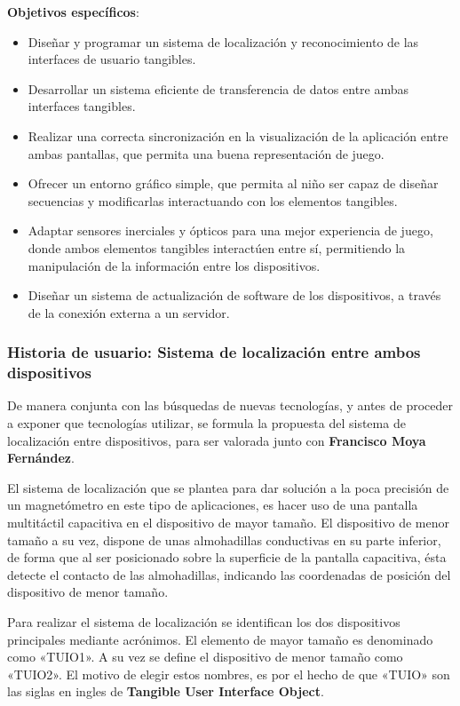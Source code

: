 \textbf{Objetivos específicos}:
\begin{itemize}
\item Diseñar y programar un sistema de localización y reconocimiento de las interfaces de usuario tangibles.

\item Desarrollar un sistema eficiente de transferencia de datos entre ambas interfaces tangibles.

\item Realizar una correcta sincronización en la visualización de la aplicación entre ambas pantallas, que permita una buena representación de juego.

\item Ofrecer un entorno gráfico simple, que permita al niño ser capaz de diseñar secuencias y modificarlas interactuando con los elementos tangibles.

\item Adaptar sensores inerciales y ópticos para una mejor experiencia de juego, donde ambos elementos tangibles interactúen entre sí, permitiendo la manipulación de la información entre los dispositivos.

\item Diseñar un sistema de actualización de software de los dispositivos, a través de la conexión externa a un servidor.
\end{itemize}

\subsubsection{Historia de usuario: Sistema de localización entre ambos dispositivos}
De manera conjunta con las búsquedas de nuevas tecnologías, y antes de proceder a exponer que tecnologías utilizar, se formula la propuesta del sistema de localización entre dispositivos, para ser valorada junto con \textbf{Francisco Moya Fernández}.

El sistema de localización que se plantea para dar solución a la poca precisión de un magnetómetro en este tipo de aplicaciones, es hacer uso de una pantalla multitáctil capacitiva en el dispositivo de mayor tamaño. El dispositivo de menor tamaño a su vez, dispone de unas almohadillas conductivas en su parte inferior, de forma que al ser posicionado sobre la superficie de la pantalla capacitiva, ésta detecte el contacto de las almohadillas, indicando las coordenadas de posición del dispositivo de menor tamaño. 

Para realizar el sistema de localización se identifican los dos dispositivos principales mediante acrónimos. El elemento de mayor tamaño es denominado como «TUIO1». A su vez se define el dispositivo de menor tamaño como «TUIO2». El motivo de elegir estos nombres, es por el hecho de que «TUIO» son las siglas en ingles de \textbf{Tangible User Interface Object}.

